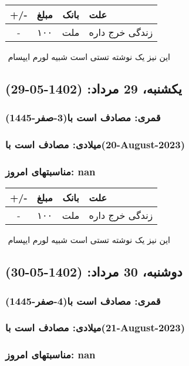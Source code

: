 \documentclass{article}
\newcommand{\rnote}[1]{\marginpar{\textcolor{color}{\StrSubstitute{\##1}{ }{\_}}}}
\newcommand{\myRow}[4]{
    #1 & #2 & #3 & #4 \\ \hline
}
\begin{document}
\begin{tabular}{ | c | c | c | p{5cm} |}
    \hline
    \myRow{ +/- }{مبلغ}{بانک}{علت}
    \myRow{-}{۱۰۰}{ملت}{زندگی خرج داره}
\end{tabular}
\newline
\newline

‌
\rnote{تست}
این نیز یک نوشته تستی است شبیه لورم ایپسام




\newpage
{}
\textcolor{color}{
\section{ یکشنبه، 29 مرداد: (1402-05-29) }
\subsubsection*{قمری: مصادف است با(3-صفر-1445)} 
\subsubsection*{میلادی: مصادف است با(20-August-2023)}
\subsubsection*{مناسبتهای امروز: nan}
}


\begin{tabular}{ | c | c | c | p{5cm} |}
    \hline
    \myRow{ +/- }{مبلغ}{بانک}{علت}
    \myRow{-}{۱۰۰}{ملت}{زندگی خرج داره}
\end{tabular}
\newline
\newline

‌
\rnote{تست}
این نیز یک نوشته تستی است شبیه لورم ایپسام




\newpage
{}
\textcolor{color}{
\section{ دوشنبه، 30 مرداد: (1402-05-30) }
\subsubsection*{قمری: مصادف است با(4-صفر-1445)} 
\subsubsection*{میلادی: مصادف است با(21-August-2023)}
\subsubsection*{مناسبتهای امروز: nan}
}
\end{document}

